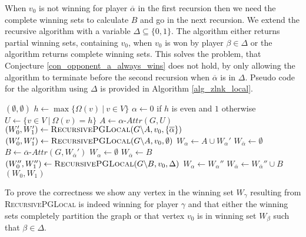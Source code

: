 When $v_0$ is not winning for player $\overline{\alpha}$ in the first recursion then we need the complete winning sets to calculate $B$ and go in the next recursion. We extend the recursive algorithm with a variable $\Delta \subseteq \{0,1\}$. The algorithm either returns partial winning sets, containing $v_0$, when $v_0$ is won by player $\beta\in \Delta$ or the algorithm returns complete winning sets. This solves the problem, that Conjecture \ref{con_opponent_a_always_wins} does not hold, by only allowing the algorithm to terminate before the second recursion when $\overline{\alpha}$ is in $\Delta$. Pseudo code for the algorithm using $\Delta$ is provided in Algorithm \ref{alg_zlnk_local}.
\begin{algorithm}
	\caption{$\textsc{RecursivePGLocal}(\textit{parity game } G = (V,V_0,V_1, E, \Omega),v_0,\Delta)$}
	\label{alg_zlnk_local}
	\begin{algorithmic}[1]
			\State \Return $(\emptyset, \emptyset)$
		\EndIf
		\State $h \gets\max\{ \Omega(v)\ |\ v \in V\}$
		\State $\alpha \gets 0$ if $h$ is even and $1$ otherwise
		\State $U \gets \{v \in V\ |\ \Omega(v) = h\}$
		\State $A \gets \alpha\textit{-Attr}(G, U)$
		\If{$\overline{\alpha} \in \Delta$}\label{line:recursivePGLocal:firstif}
		\State $(W_0', W_1') \gets \textsc{RecursivePGLocal}(G \backslash A,v_0,\{\overline{\alpha}\})$\label{line:recursivePGLocal:recuGA1}
		\Else
		\State $(W_0', W_1') \gets \textsc{RecursivePGLocal}(G \backslash A,v_0,\emptyset)$\label{line:recursivePGLocal:recuGA2}
		\EndIf
		\label{line:recursivePGLocal:emptywinif}
		\State $W_\alpha \gets A \cup W_\alpha'$
		\State $W_{\overline{\alpha}} \gets \emptyset$
		\Else
		\State $B \gets \overline{\alpha}\textit{-Attr}(G,W_{\overline{\alpha}}')$\label{line:recursivePGLocal:calcB}
		\label{line:recursivePGLocal:v0inB}
		\State $W_\alpha \gets \emptyset$
		\State $W_{\overline{\alpha}} \gets B$
		\Else
		\State $(W_0'', W_1'') \gets \textsc{RecursivePGLocal}(G \backslash B,v_0,\Delta)$\label{line:recursivePGLocal:secondrecursion}
		\State $W_\alpha \gets W_\alpha''$
		\State $W_{\overline{\alpha}} \gets W_{\overline{\alpha}}'' \cup B$
		\EndIf
		\EndIf
		\State \Return $(W_0, W_1)$
	\end{algorithmic}
\end{algorithm}

To prove the correctness we show any vertex in the winning set $W_\gamma$ resulting from \textsc{RecursivePGLocal} is indeed winning for player $\gamma$ and that either the winning sets completely partition the graph or that vertex $v_0$ is in winning set $W_\beta$ such that $\beta \in \Delta$.

